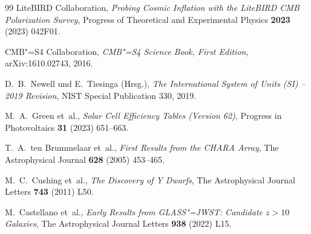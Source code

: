 ﻿\documentclass[a4paper,12pt]{article}
\theoremstyle{definition}
\begin{document}
\begin{thebibliography}{99}
LiteBIRD Collaboration,
\textit{Probing Cosmic Inflation with the LiteBIRD CMB Polarization Survey},
Progress of Theoretical and Experimental Physics \textbf{2023} (2023) 042F01.

CMB"=S4 Collaboration,
\textit{CMB"=S4 Science Book, First Edition},
arXiv:1610.02743, 2016.

D.~B.~Newell und E.~Tiesinga (Hrsg.),
\textit{The International System of Units (SI) -- 2019 Revision},
NIST Special Publication 330, 2019.

M.~A.~Green et~al.,
\textit{Solar Cell Efficiency Tables (Version 62)},
Progress in Photovoltaics \textbf{31} (2023) 651--663.

T.~A.~ten Brummelaar et~al.,
\textit{First Results from the CHARA Array},
The Astrophysical Journal \textbf{628} (2005) 453--465.

M.~C.~Cushing et~al.,
\textit{The Discovery of Y Dwarfs},
The Astrophysical Journal Letters \textbf{743} (2011) L50.

M.~Castellano et~al.,
\textit{Early Results from GLASS"=JWST: Candidate $z > 10$ Galaxies},
The Astrophysical Journal Letters \textbf{938} (2022) L15.

\end{thebibliography}
\end{document}
